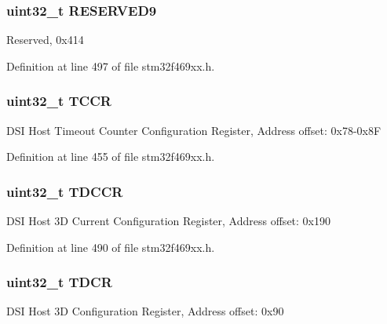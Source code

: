 \subsubsection[{\texorpdfstring{R\+E\+S\+E\+R\+V\+E\+D9}{RESERVED9}}]{\setlength{\rightskip}{0pt plus 5cm}uint32\+\_\+t R\+E\+S\+E\+R\+V\+E\+D9}\hypertarget{struct_d_s_i___type_def_ad5e6ea0a37a7f654716cd4036ad9d54a}{}\label{struct_d_s_i___type_def_ad5e6ea0a37a7f654716cd4036ad9d54a}
Reserved, 0x414 

Definition at line 497 of file stm32f469xx.\+h.

\subsubsection[{\texorpdfstring{T\+C\+CR}{TCCR}}]{ uint32\+\_\+t T\+C\+CR}\hypertarget{struct_d_s_i___type_def_af739b272242d2b13e67f53ddb908ff97}{}\label{struct_d_s_i___type_def_af739b272242d2b13e67f53ddb908ff97}
D\+SI Host Timeout Counter Configuration Register, Address offset\+: 0x78-\/0x8F 

Definition at line 455 of file stm32f469xx.\+h.

\subsubsection[{\texorpdfstring{T\+D\+C\+CR}{TDCCR}}]{ uint32\+\_\+t T\+D\+C\+CR}\hypertarget{struct_d_s_i___type_def_a18c15f63e6eeeb8cae9403c81ed5419f}{}\label{struct_d_s_i___type_def_a18c15f63e6eeeb8cae9403c81ed5419f}
D\+SI Host 3D Current Configuration Register, Address offset\+: 0x190 

Definition at line 490 of file stm32f469xx.\+h.

\subsubsection[{\texorpdfstring{T\+D\+CR}{TDCR}}]{ uint32\+\_\+t T\+D\+CR}\hypertarget{struct_d_s_i___type_def_ac689816b67ce3d5a6ef496bd97c57eca}{}\label{struct_d_s_i___type_def_ac689816b67ce3d5a6ef496bd97c57eca}
D\+SI Host 3D Configuration Register, Address offset\+: 0x90 

